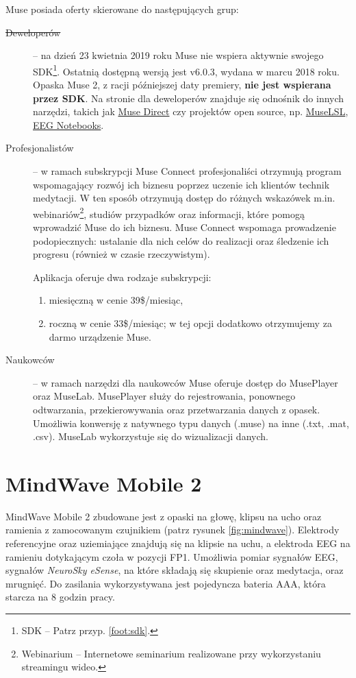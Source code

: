 \documentclass[skorowidz,skroty]{dyplomWEZUT}
\begin{document}
Muse posiada oferty skierowane do następujących grup:
\begin{description}
    \item [\sout{Deweloperów}] -- na dzień 23 kwietnia 2019 roku Muse nie wspiera aktywnie swojego SDK\footnote{SDK -- Patrz przyp. \vref{foot:sdk}.}. Ostatnią dostępną wersją jest v6.0.3, wydana w marcu 2018 roku. Opaska Muse 2, z racji późniejszej daty premiery, \textbf{nie jest wspierana przez SDK}. Na stronie dla deweloperów\cite{muse_developer} znajduje się odnośnik do innych narzędzi, takich jak \href{https://choosemuse.com/muse-direct/}{Muse Direct} czy projektów open source, np. \href{https://github.com/alexandrebarachant/muse-lsl}{MuseLSL}, \href{https://github.com/NeuroTechX/eeg-notebooks}{EEG Notebooks}.

    \item [Profesjonalistów] -- w ramach subskrypcji Muse Connect profesjonaliści otrzymują program wspomagający rozwój ich biznesu poprzez uczenie ich klientów technik medytacji\cite{muse_professional}. W ten sposób otrzymują dostęp do różnych wskazówek m.in. webinariów\footnote{Webinarium -- Internetowe seminarium realizowane przy wykorzystaniu streamingu wideo.}, studiów przypadków oraz informacji, które pomogą wprowadzić Muse do ich biznesu. Muse Connect wspomaga prowadzenie podopiecznych: ustalanie dla nich celów do realizacji oraz śledzenie ich progresu (również w czasie rzeczywistym).

    Aplikacja oferuje dwa rodzaje subskrypcji:
    \begin{enumerate}
        \item miesięczną w cenie 39\$/miesiąc,
        \item roczną w cenie 33\$/miesiąc; w tej opcji dodatkowo otrzymujemy za darmo urządzenie Muse.
    \end{enumerate}

    \item [Naukowców] -- w ramach narzędzi dla naukowców Muse oferuje dostęp do MusePlayer oraz MuseLab. MusePlayer służy do rejestrowania, ponownego odtwarzania, przekierowywania oraz przetwarzania danych z opasek. Umożliwia konwersję z natywnego typu danych (.muse) na inne (.txt, .mat, .csv). MuseLab wykorzystuje się do wizualizacji danych.
\end{description}


\section{MindWave Mobile 2}
MindWave Mobile 2 zbudowane jest z opaski na głowę, klipsu na ucho oraz ramienia z zamocowanym czujnikiem (patrz rysunek \vref{fig:mindwave}). Elektrody referencyjne oraz uziemiające znajdują się na klipsie na uchu, a elektroda EEG na ramieniu dotykającym czoła w pozycji FP1. Umożliwia pomiar sygnałów EEG, sygnałów \textit{NeuroSky eSense}, na które składają się skupienie oraz medytacja, oraz mrugnięć. Do zasilania wykorzystywana jest pojedyncza bateria AAA, która starcza na 8 godzin pracy\cite{mindwave}.
\end{document}
